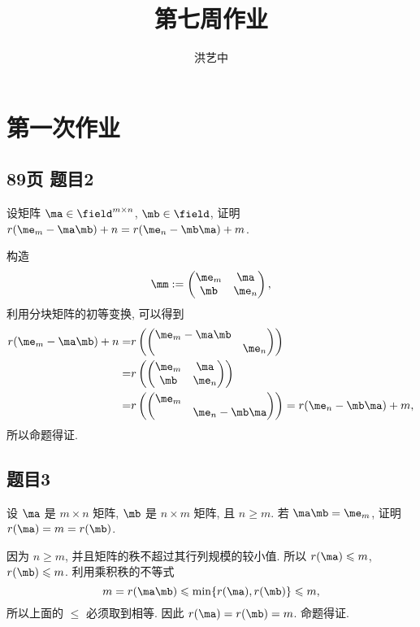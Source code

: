 \title{第七周作业}
\author{洪艺中}
\maketitle
\section{第一次作业}
\subsection*{89页 题目2}
\begin{problem*}
设矩阵 $\ma \in \field^{m \times n}$, $\mb \in \field$, 证明 $r(\me_m - \ma\mb) + n = r(\me_n - \mb\ma) + m$.
\end{problem*}
\begin{solution}
构造
\[
\mm := \begin{pmatrix}
    \me_m & \ma \\
    \mb & \me_n
\end{pmatrix},
\]
利用分块矩阵的初等变换, 可以得到
\[
\begin{aligned}
    r(\me_m - \ma\mb) + n
    =&
    r\left(\begin{pmatrix}
        \me_m - \ma\mb &  \\
         & \me_n
    \end{pmatrix}\right) \\
    =&
    r\left(\begin{pmatrix}
        \me_m & \ma \\
        \mb & \me_n
    \end{pmatrix}\right) \\
    =& r\left(\begin{pmatrix}
        \me_m &  \\
         & \me_n - \mb\ma
    \end{pmatrix}\right)
    =
    r(\me_n - \mb\ma) + m,
\end{aligned}
\]
所以命题得证.
\end{solution}

\subsection*{题目3}
\begin{problem*}
设 $\ma$ 是 $m \times n$ 矩阵, $\mb$ 是 $n \times m$ 矩阵, 且 $n \geqslant m$. 若 $\ma \mb = \me_m$, 证明 $r(\ma) = m = r(\mb)$.
\end{problem*}
\begin{solution}
因为 $ n \geqslant m$, 并且矩阵的秩不超过其行列规模的较小值. 所以 $r(\ma) \leqslant m$, $r(\mb) \leqslant m$. 利用乘积秩的不等式
\[
    m = r(\ma \mb) \leqslant \min\{r(\ma), r(\mb)\} \leqslant m,
\]
所以上面的 $\leqslant $ 必须取到相等. 因此 $r(\ma) = r(\mb) = m$. 命题得证.
\end{solution}

